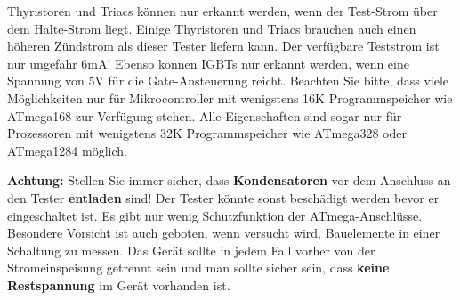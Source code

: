 Thyristoren und Triacs können nur erkannt werden, wenn der Test-Strom über dem Halte-Strom liegt.
Einige Thyristoren und Triacs brauchen auch einen höheren Zündstrom als dieser Tester liefern kann.
Der verfügbare Teststrom ist nur ungefähr 6mA!
Ebenso können IGBTs nur erkannt werden, wenn eine Spannung von 5V für die Gate-Ansteuerung reicht.
Beachten Sie bitte, dass viele Möglichkeiten nur für Mikrocontroller mit wenigstens 16K Programmspeicher wie ATmega168 zur Verfügung stehen. 
Alle Eigenschaften sind sogar nur für Prozessoren mit wenigstens 32K Programmspeicher wie ATmega328 oder ATmega1284 möglich.

\vspace{1cm}
\textbf{{\Large Achtung:}} Stellen Sie immer sicher, dass {\bf Kondensatoren} vor dem Anschluss an den Tester {\bf entladen} sind!
Der Tester könnte sonst beschädigt werden bevor er eingeschaltet ist.
Es gibt nur wenig Schutzfunktion der ATmega-Anschlüsse.
Besondere Vorsicht ist auch geboten, wenn versucht wird, Bauelemente in einer Schaltung zu messen.
Das Gerät sollte in jedem Fall vorher von der Strom\-ein\-spei\-sung getrennt sein und man sollte sicher sein,
dass {\bf keine Restspannung} im Gerät vorhanden ist.


